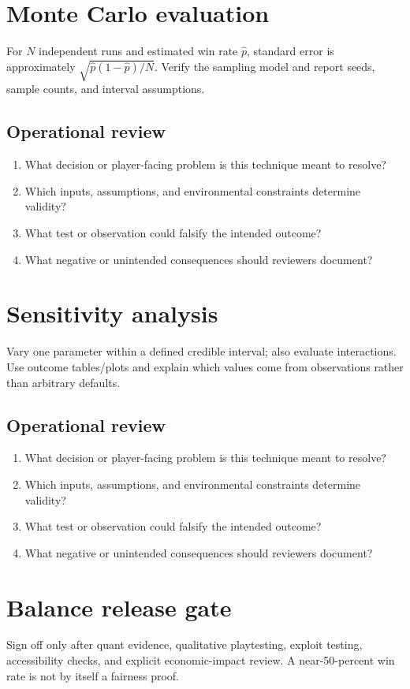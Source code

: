 \documentclass[11pt]{article}
\begin{document}
\section{Monte Carlo evaluation}
For $N$ independent runs and estimated win rate $\hat p$, standard error is approximately $\sqrt{\hat p(1-\hat p)/N}$. Verify the sampling model and report seeds, sample counts, and interval assumptions.


\subsection{Operational review}
\begin{enumerate}
\item What decision or player-facing problem is this technique meant to resolve?
\item Which inputs, assumptions, and environmental constraints determine validity?
\item What test or observation could falsify the intended outcome?
\item What negative or unintended consequences should reviewers document?
\end{enumerate}

\section{Sensitivity analysis}
Vary one parameter within a defined credible interval; also evaluate interactions. Use outcome tables/plots and explain which values come from observations rather than arbitrary defaults.


\subsection{Operational review}
\begin{enumerate}
\item What decision or player-facing problem is this technique meant to resolve?
\item Which inputs, assumptions, and environmental constraints determine validity?
\item What test or observation could falsify the intended outcome?
\item What negative or unintended consequences should reviewers document?
\end{enumerate}

\section{Balance release gate}
Sign off only after quant evidence, qualitative playtesting, exploit testing, accessibility checks, and explicit economic-impact review. A near-50-percent win rate is not by itself a fairness proof.
\end{document}
